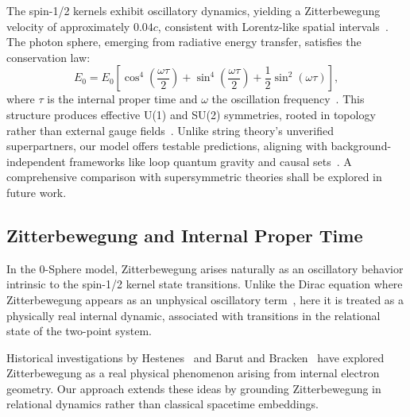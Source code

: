 \documentclass[%
 reprint,
 amsmath,amssymb,
 aps,
]{revtex4-1}
\numberwithin{equation}{section}%
\begin{document}
The spin-1/2 kernels exhibit oscillatory dynamics, yielding a Zitterbewegung velocity of approximately $0.04c$, consistent with Lorentz-like spatial intervals~\cite{hanamura2309.0047}. The photon sphere, emerging from radiative energy transfer, satisfies the conservation law:
\begin{equation}
E_0 = E_0\left[\cos^4\left(\frac{\omega\tau}{2}\right) + \sin^4\left(\frac{\omega\tau}{2}\right) + \frac{1}{2}\sin^2(\omega\tau)\right],
\end{equation}
where \(\tau\) is the internal proper time and \(\omega\) the oscillation frequency~\cite{hanamura2506.0072}. This structure produces effective U(1) and SU(2) symmetries, rooted in topology rather than external gauge fields~\cite{hanamura2506.0072}. Unlike string theory's unverified superpartners, our model offers testable predictions, aligning with background-independent frameworks like loop quantum gravity and causal sets~\cite{rovelli2004, sorkin2003}. A comprehensive comparison with supersymmetric theories shall be explored in future work.

\subsection{Zitterbewegung and Internal Proper Time}
\label{subsec:zitterbewegung}

In the 0-Sphere model, Zitterbewegung arises naturally as an oscillatory behavior intrinsic to the spin-1/2 kernel state transitions. Unlike the Dirac equation where Zitterbewegung appears as an unphysical oscillatory term~\cite{dirac1928, schrodinger1930}, here it is treated as a physically real internal dynamic, associated with transitions in the relational state of the two-point system.

Historical investigations by Hestenes~\cite{hestenes1990} and Barut and Bracken~\cite{barut1981} have explored Zitterbewegung as a real physical phenomenon arising from internal electron geometry. Our approach extends these ideas by grounding Zitterbewegung in relational dynamics rather than classical spacetime embeddings.
\end{document}
